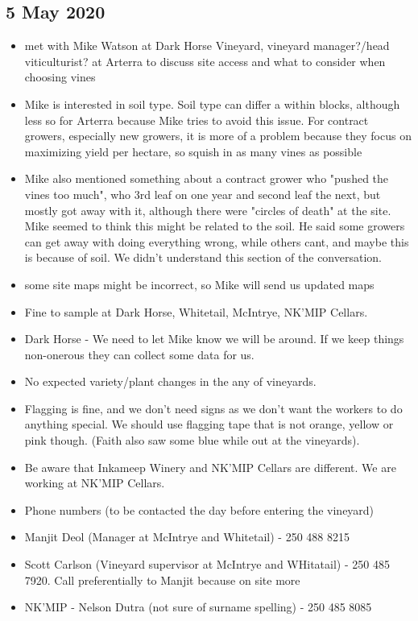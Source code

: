 \documentclass[11pt,letter]{article}
\newenvironment{smitemize}{
\begin{itemize}
  \setlength{\itemsep}{0pt}
  \setlength{\parskip}{0.8pt}
  \setlength{\parsep}{0pt}}
{\end{itemize}
}
\begin{document}
\subsection{5 May 2020}
\begin{smitemize}
\item met with Mike Watson at Dark Horse Vineyard, vineyard manager?/head viticulturist? at Arterra to discuss site access and what to consider when choosing vines
\item Mike is interested in soil type. Soil type can differ a within blocks, although less so for Arterra because Mike tries to avoid this issue. For contract growers, especially new growers, it is more of a problem because they focus on maximizing yield per hectare, so squish in as many vines as possible
\item Mike also mentioned something about a contract grower who "pushed the vines too much", who 3rd leaf on one year and second leaf the next, but mostly got away with it, although there were "circles of death" at the site. Mike seemed to think this might be related to the soil. He said some growers can get away with doing everything wrong, while others cant, and maybe this is because of soil. We didn't understand this section of the conversation.
\item some site maps might be incorrect, so Mike will send us updated maps
\item Fine to sample at Dark Horse, Whitetail, McIntrye, NK'MIP Cellars.
\item Dark Horse - We need to let Mike know we will be around. If we keep things non-onerous they can collect some data for us.
\item No expected variety/plant changes in the any of vineyards.
\item Flagging is fine, and we don't need signs as we don't want the workers to do anything special. We should use flagging tape that is not orange, yellow or pink though. (Faith also saw some blue while out at the vineyards).
\item Be aware that Inkameep Winery and NK'MIP Cellars are different. We are working at NK'MIP Cellars.
\item Phone numbers (to be contacted the day before entering the vineyard)
\item Manjit Deol (Manager at McIntrye and Whitetail) - 250 488 8215
\item Scott Carlson (Vineyard supervisor at McIntrye and WHitatail) - 250 485 7920. Call preferentially to Manjit because on site more
\item NK'MIP - Nelson Dutra (not sure of surname spelling) - 250 485 8085

\end{smitemize}
\end{document}
